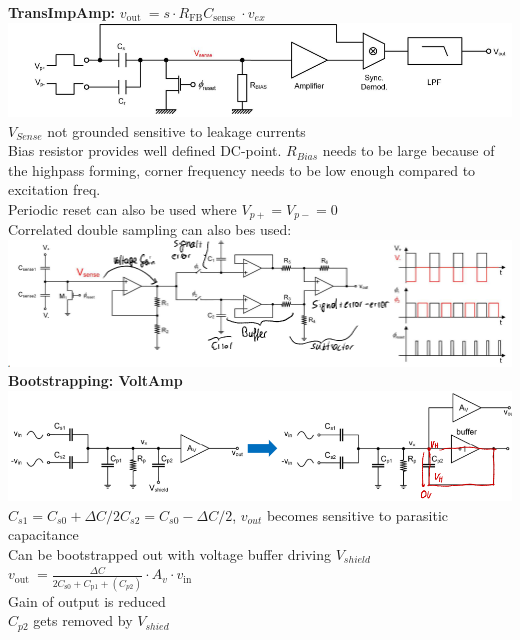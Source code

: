 \documentclass[5pt,landscape]{article}
\begin{document}
\begin{multicols*}{5}
\textbf{TransImpAmp:} $ v_{\text {out }}=s \cdot R_{\mathrm{FB}} C_{\text {sense }} \cdot v_{e x} $\\
\includegraphics[width=\columnwidth]{images/dc_pot_capa.png}\\
$ V_{Sense} $ not grounded sensitive to leakage currents\\
Bias resistor provides well defined DC-point. $ R_{Bias} $ needs to be large because of the highpass forming, corner frequency needs to be low enough compared to excitation freq. \\
Periodic reset can also be used where $ V_{p+} = V_{p-} =0  $\\
Correlated double sampling can also bes used:\\
\includegraphics[width=\columnwidth]{images/corr_double_sample.png}\\
\textbf{Bootstrapping: VoltAmp}\\
\includegraphics[width=\columnwidth]{images/bootstrapping.png}\\
$ C_{s 1}=C_{s 0}+\Delta C / 2 $$ C_{s 2}=C_{s 0}-\Delta C / 2 $, $ v_{out} $ becomes sensitive to parasitic capacitance\\
Can be bootstrapped out with voltage buffer driving $ V_{shield} $\\
$ v_{\text {out }}=\frac{\Delta C}{2 C_{\mathrm{s} 0}+C_{\mathrm{p} 1} +(C_{p2})} \cdot A_{v} \cdot v_{\text {in }} $ \\
Gain of output is reduced\\
 $C_{p2} $ gets removed by $V_{shied} $\\
$$
\end{multicols*}
\end{document}

